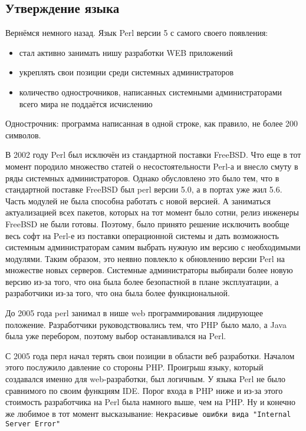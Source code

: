 \subsection{Утверждение языка}
Вернёмся немного назад. Язык Perl версии 5 с самого своего появления:
\begin{itemize}
 \item стал активно занимать нишу разработки WEB приложений
 \item укреплять свои позиции среди системных администраторов
 \item количество однострочников, написанных системными администраторами всего мира не поддаётся исчислению
\end{itemize}

Однострочник: программа написанная в одной строке, как правило, не более 200 символов.

В 2002 году Perl был исключён из стандартной поставки FreeBSD. Что еще в тот момент породило множество статей  о несостоятельности Perl-а и внесло смуту в ряды системных администраторов. Однако обусловлено это было тем, что в стандартной поставке FreeBSD был perl версии 5.0, а в портах уже жил 5.6. Часть модулей не была способна работать с новой версией. А заниматься актуализацией всех пакетов, которых на тот момент было сотни, релиз инженеры FreeBSD не были готовы. Поэтому, было принято решение исключить вообще весь софт на Perl-е из поставки операционной системы и дать возможность системным администраторам самим выбрать нужную им версию с необходимыми модулями. Таким образом, это неявно повлекло к обновлению версии Perl на множестве новых серверов. Системные администраторы выбирали более новую версию из-за того, что она была более безопастной в плане эксплуатации, а разработчики из-за того, что она была более функциональной.

До 2005 года perl занимал в нише web программирования лидирующее положение. Разработчики руководствовались тем, что PHP было мало, а Java была уже перебором, поэтому выбор останавливался на Perl.

С 2005 года перл начал терять свои позиции в области веб разработки. Началом этого послужило давление со стороны PHP. Проигрыш языку, который создавался именно для web-разработки, был логичным. У языка Perl не было сравнимого по своим функциям IDE. Порог входа в PHP ниже и из-за этого стоимость разработчика на Perl была намного выше, чем на PHP. Ну и конечно же любимое в тот момент высказывание: \verb|Некрасивые ошибки вида "Internal Server Error"|

